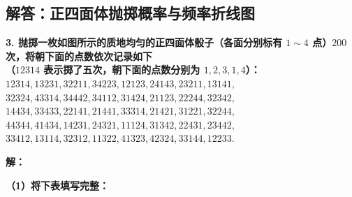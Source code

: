 ﻿%

\subsection{解答：正四面体抛掷概率与频率折线图}

\vspace{0.6cm}

\textbf{3. 抛掷一枚如图所示的质地均匀的正四面体骰子（各面分别标有 $1 \sim 4$ 点）$200$ 次，将朝下面的点数依次记录如下\\
（$12314$ 表示掷了五次，朝下面的点数分别为 $1, 2, 3, 1, 4$）：\\}
$12314, 13231, 32211, 34223, 12123, 24143, 23211, 13141,$\\
$32324, 43314, 34442, 34112, 31424, 21123, 22244, 32342,$\\
$14434, 33433, 22141, 21441, 33314, 21421, 31221, 32244,$\\
$44344, 41434, 14231, 24321, 11124, 31342, 22431, 23442,$\\
$33412, 13114, 32312, 11322, 41323, 42324, 33144, 12233.$


\vspace{0.4cm}

\textbf{解：}

\textbf{（1）将下表填写完整：}

